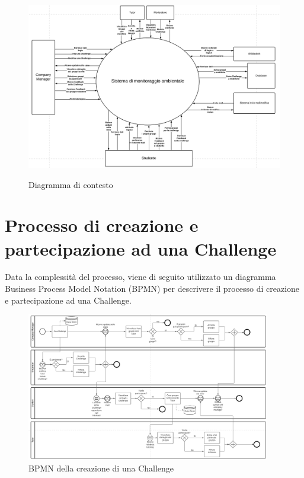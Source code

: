 \begin{figure}[H]
    \centering
    \includegraphics[scale=0.46]{images/diagrama_di_contesto.png}
    \label{fig:diagrama_di_contesto}
    \caption{Diagramma di contesto}
\end{figure}

\section{Processo di creazione e partecipazione ad una Challenge}

Data la complessità del processo, viene di seguito utilizzato un diagramma Business Process Model Notation (BPMN) per descrivere il processo di creazione e partecipazione ad una Challenge. 

\begin{figure}[H]
    \centering
        \includegraphics[width=0.95\textwidth]{images/BPMN_Challenge.png}
    \caption{BPMN della creazione di una Challenge}
    \label{fig:BPMN_Challenge}
\end{figure}


